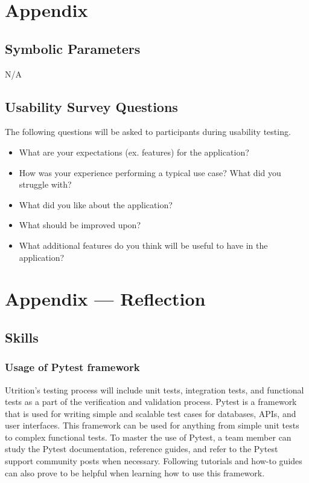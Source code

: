 \documentclass[12pt, titlepage]{article}
\begin{document}
	
	
	
	
	
	
	\newpage
	
	\section{Appendix}
	
	\subsection{Symbolic Parameters}
	
	N/A
	
	\subsection{Usability Survey Questions}
	
	The following questions will be asked to participants during usability testing.
	\begin{itemize}
		\item What are your expectations (ex. features) for the application? 
		\item How was your experience performing a typical use case? What did you struggle with? 
		\item What did you like about the application? 
		\item What should be improved upon? 
		\item What additional features do you think will be useful to have in the application? 
	\end{itemize}
	
	\newpage{}
	\section*{Appendix --- Reflection}
	
	\subsection*{Skills}
	
	\subsubsection*{Usage of Pytest framework}
	Utrition's testing process will include unit tests, integration tests, and functional tests as a part of the verification and validation process. Pytest is a framework that is used for writing simple and scalable test cases for databases, APIs, and user interfaces. This framework can be used for anything from simple unit tests to complex functional tests. To master the use of Pytest, a team member can study the Pytest documentation, reference guides, and refer to the Pytest support community posts when necessary. Following tutorials and how-to guides can also prove to be helpful when learning how to use this framework.  
	
\end{document}
